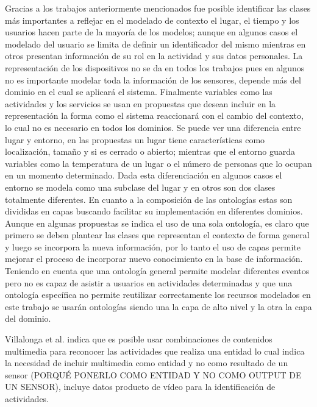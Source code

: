 Gracias a los trabajos anteriormente mencionados fue posible identificar las clases más importantes a reflejar en el modelado de contexto el lugar, el tiempo y los usuarios hacen parte de la mayoría de los modelos; aunque en algunos casos el modelado del usuario se limita de definir un identificador del mismo mientras en otros presentan información de su rol en la actividad y sus datos personales. La representación de los dispositivos no se da en todos los trabajos pues en algunos no es importante modelar toda la información de los sensores, depende más del dominio en el cual se aplicará el sistema.
Finalmente variables como las actividades y los servicios se usan en propuestas que desean incluir en la representación la forma como el sistema reaccionará con el cambio del contexto, lo cual no es necesario en todos los dominios.
Se puede ver una diferencia entre lugar y entorno, en las propuestas un lugar tiene características como localización, tamaño y si es cerrado o abierto; mientras que el entorno guarda variables como la temperatura de un lugar o el número de personas que lo ocupan en un momento determinado. Dada esta diferenciación en algunos casos el entorno se modela como una subclase del lugar y en otros son dos clases totalmente diferentes.
En cuanto a la composición de las ontologías estas son divididas en capas buscando facilitar su implementación en diferentes dominios. Aunque en algunas propuestas se indica el uso de una sola ontología, es claro que primero se deben plantear las clases que representan el contexto de forma general y luego se incorpora la nueva información, por lo tanto el uso de capas permite mejorar el proceso de incorporar nuevo conocimiento en la base de información. Teniendo en cuenta que una ontología general permite modelar diferentes eventos pero no es capaz de asistir a usuarios en actividades determinadas y que una ontología específica no permite reutilizar correctamente los recursos modelados \cite{Iaz2014} en este trabajo se usarán ontologías siendo una la capa de alto nivel y la otra la capa del dominio.    


Villalonga et al. \cite{Villalonga2015} indica que es posible usar combinaciones de contenidos multimedia para reconocer las actividades que realiza una entidad lo cual indica la necesidad de incluir multimedia como entidad y no como resultado de un sensor (PORQUÉ PONERLO COMO ENTIDAD Y NO COMO OUTPUT DE UN SENSOR), \cite{Lazarou2016} incluye datos producto de vídeo para la identificación de actividades.


